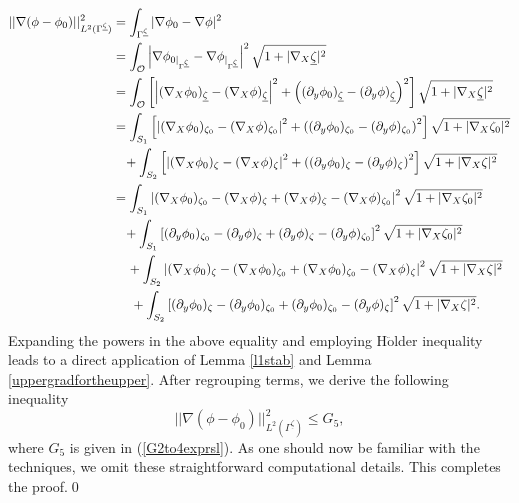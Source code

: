 \documentclass[11pt]{article}
\begin{document}
\begin{equation*}
	\begin{split}
		||\nabla (\phi-\phi_0)||_{L^2(\Gamma^{\underline{\zeta}})}^2&=\displaystyle\int_{\Gamma^{\underline{\zeta}}}|\nabla\phi_0-\nabla\phi|^2\\
		&=\displaystyle\int_{\mathcal O }\left|\nabla\phi_{0|_{\Gamma^{\underline{\zeta}}}}-\nabla\phi_{|_{\Gamma^{\underline{\zeta}}}}\right|^2\sqrt{1+|\nabla_X\underline{\zeta}|^2}\\
		&=\displaystyle\int_{\mathcal O }\left[\left|(\nabla_X\phi_0)_{\underline{\zeta}}-(\nabla_X\phi)_{\underline{\zeta}}\right|^2+\left((\partial_y\phi_0)_{\underline{\zeta}}-(\partial_y\phi)_{\underline{\zeta}}\right)^2\right]\sqrt{1+|\nabla_X\underline{\zeta}|^2}\\
		&=\displaystyle\int_{S_1}\left[\left|(\nabla_X\phi_0)_{\zeta_0}-(\nabla_X\phi)_{\zeta_0}\right|^2+\left((\partial_y\phi_0)_{\zeta_0}-(\partial_y\phi)_{\zeta_0}\right)^2\right]\sqrt{1+|\nabla_X\zeta_0|^2}\\
		&\hspace{0.3cm}+\displaystyle\int_{S_2}\left[\left|(\nabla_X\phi_0)_{\zeta}-(\nabla_X\phi)_{\zeta}\right|^2+\left((\partial_y\phi_0)_{\zeta}-(\partial_y\phi)_{\zeta}\right)^2\right]\sqrt{1+|\nabla_X\zeta|^2}\\
		&=\displaystyle\int_{S_1}\left|(\nabla_X\phi_0)_{\zeta_0}-(\nabla_X\phi)_{\zeta}+(\nabla_X\phi)_{\zeta}-(\nabla_X\phi)_{\zeta_0}\right|^2\sqrt{1+|\nabla_X\zeta_0|^2}\\
		&\hspace{0.3cm}+\displaystyle\int_{S_1}\left[(\partial_y\phi_0)_{\zeta_0}-(\partial_y\phi)_{\zeta}+(\partial_y\phi)_{\zeta}-(\partial_y\phi)_{\zeta_0}\right]^2\sqrt{1+|\nabla_X\zeta_0|^2}\\
		&\hspace{0.4cm}+\displaystyle\int_{S_2}\left|(\nabla_X\phi_0)_{\zeta}-(\nabla_X\phi_0)_{\zeta_0}+(\nabla_X\phi_0)_{\zeta_0}-(\nabla_X\phi)_{\zeta}\right|^2\sqrt{1+|\nabla_X\zeta|^2}\\
		&\hspace{0.5cm}+\displaystyle\int_{S_2}\left[(\partial_y\phi_0)_{\zeta}-(\partial_y\phi_0)_{\zeta_0}+(\partial_y\phi_0)_{\zeta_0}-(\partial_y\phi)_{\zeta}\right]^2\sqrt{1+|\nabla_X\zeta|^2}.
	\end{split}
\end{equation*}
Expanding the powers in the above equality and employing H$\ddot{\text{o}}$lder inequality leads to a direct application of  Lemma \ref{l1stab} and Lemma \ref{uppergradfortheupper}. After regrouping terms, we derive the following inequality
$$||\nabla (\phi-\phi_0)||_{L^2(\Gamma^{\underline{\zeta}})}^2\leq G_5, $$
where $G_5$ is given in (\ref{G2to4exprsl}).
As one should now be familiar with the techniques, we omit these straightforward computational details.
This completes the proof.\qed
\end{document}
